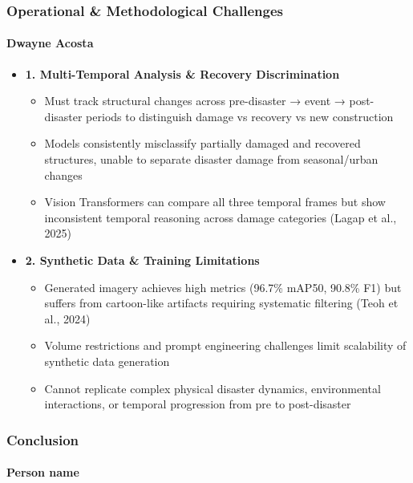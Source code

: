 \documentclass{beamer}
\newcommand{\namedframe}[3]{
  \begin{frame}
    \frametitle{#2}
    \framesubtitle{#1}
    #3
  \end{frame}
}
\begin{document}
\namedframe{Dwayne Acosta}{Operational \& Methodological Challenges}{
\begin{itemize}
    \item \textbf{1. Multi-Temporal Analysis \& Recovery Discrimination}
    \begin{itemize}
        \item Must track structural changes across pre-disaster → event → post-disaster periods to distinguish damage vs recovery vs new construction
        \item Models consistently misclassify partially damaged and recovered structures, unable to separate disaster damage from seasonal/urban changes
        \item Vision Transformers can compare all three temporal frames but show inconsistent temporal reasoning across damage categories (Lagap et al., 2025)
    \end{itemize}
    
    \item \textbf{2. Synthetic Data \& Training Limitations}
    \begin{itemize}
        \item Generated imagery achieves high metrics (96.7\% mAP50, 90.8\% F1) but suffers from cartoon-like artifacts requiring systematic filtering (Teoh et al., 2024)
        \item Volume restrictions and prompt engineering challenges limit scalability of synthetic data generation
        \item Cannot replicate complex physical disaster dynamics, environmental interactions, or temporal progression from pre to post-disaster
    \end{itemize}
\end{itemize}
}
\namedframe{Person name}{Conclusion}{

}
\end{document}
